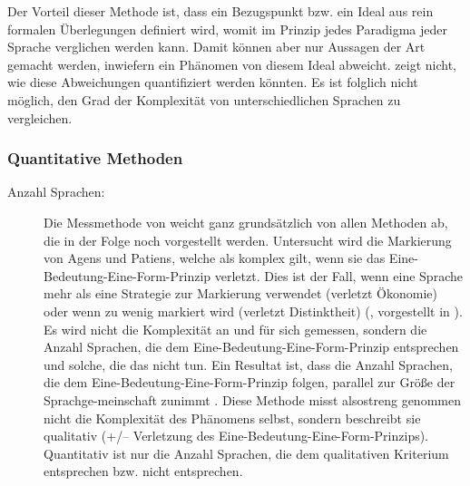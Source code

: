 \begin{exe}
\begin{exe}
Der Vorteil dieser Methode ist, dass ein Bezugspunkt bzw. ein Ideal aus rein formalen Überlegungen definiert wird, womit im Prinzip jedes Paradigma jeder Sprache verglichen werden kann. Damit können aber nur Aussagen der Art gemacht werden, inwiefern ein Phänomen von diesem Ideal abweicht. \citet{Camilleri2012} zeigt nicht, wie diese Abweichungen quantifiziert werden könnten. Es ist folglich nicht möglich, den Grad der Komplexität von unterschiedlichen Sprachen zu vergleichen.

\subsubsection{Quantitative Methoden}\label{4.3.1.2}
\begin{description}
\item[Anzahl Sprachen:] Die Messmethode von \citet{Sinnemäki2009} weicht ganz grundsätzlich von allen Methoden ab, die in der Folge noch vorgestellt werden. Untersucht wird die Markierung von Agens und Patiens, welche als komplex gilt, wenn sie das Eine-Bedeutung-Eine-Form-Prinzip verletzt. Dies ist der Fall, wenn eine Sprache mehr als eine Strategie zur Markierung verwendet (verletzt Ökonomie) oder wenn zu wenig markiert wird (verletzt Distinktheit) (\citealt[130–133]{Sinnemäki2009}, vorgestellt in ). Es wird nicht die Komplexität an und für sich gemessen, sondern die Anzahl Sprachen, die dem Eine-Bedeutung-Eine-Form-Prinzip entsprechen und solche, die das nicht tun. Ein Resultat ist, dass die Anzahl Sprachen, die dem Eine-Bedeutung-Eine-Form-Prinzip folgen, parallel zur Größe der Sprachge-\linebreak meinschaft zunimmt \citep[135]{Sinnemäki2009}. Diese Methode misst also\linebreak streng genommen nicht die Komplexität des Phänomens selbst, sondern beschreibt sie qualitativ (+/– Verletzung des Eine-Bedeutung-Eine-Form-Prinzips). Quantitativ ist nur die Anzahl Sprachen, die dem qualitativen Kriterium entsprechen bzw. nicht entsprechen.


\end{description}
\end{exe}
\end{exe}
